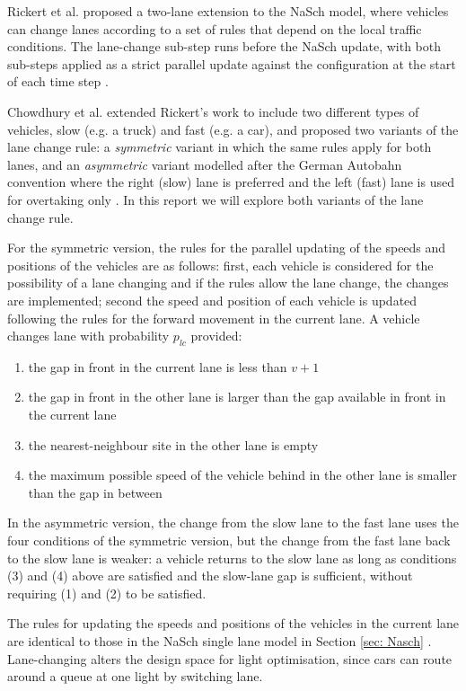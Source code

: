 Rickert et al. proposed a two-lane extension to the NaSch model, where vehicles can change lanes according to a set of rules that depend on the local traffic conditions.
The lane-change sub-step runs before the NaSch update, with both sub-steps applied as a strict parallel update against the configuration at the start of each time step \cite{rickertTwoLaneTraffic1996}.

Chowdhury et al. extended Rickert's work to include two different types of vehicles, slow (e.g. a truck) and fast (e.g. a car), and proposed two variants of the lane change rule: a \textit{symmetric} variant in which the same rules apply for both lanes, and an \textit{asymmetric} variant modelled after the German Autobahn convention where the right (slow) lane is preferred and the left (fast) lane is used for overtaking only \cite{chowdhuryParticleHoppingModels1997}.
In this report we will explore both variants of the lane change rule.


For the symmetric version, the rules for the parallel updating of the speeds and positions of the vehicles are as follows: first, each vehicle is considered for the possibility of a lane changing and if the rules allow the lane change, the changes are implemented; second the speed and position of each vehicle is updated following the rules for the forward movement in the current lane. A vehicle changes lane with probability $p_{lc}$ provided:
\begin{enumerate}
    \item the gap in front in the current lane is less than $v + 1$
    \item the gap in front in the other lane is larger than the gap available in front in the current lane
    \item the nearest-neighbour site in the other lane is empty
    \item the maximum possible speed of the vehicle behind in the other lane is smaller than the gap in between 
\end{enumerate}

In the asymmetric version, the change from the slow lane to the fast lane uses the four conditions of the symmetric version, but the change from the fast lane back to the slow lane is weaker: a vehicle returns to the slow lane as long as conditions (3) and (4) above are satisfied and the slow-lane gap is sufficient, without requiring (1) and (2) to be satisfied.

The rules for updating the speeds and positions of the vehicles in the current lane are identical to those in the NaSch single lane model in Section \ref{sec: Nasch} \cite{chowdhuryParticleHoppingModels1997}. Lane-changing alters the design space for light optimisation, since cars can route around a queue at one light by switching lane.

